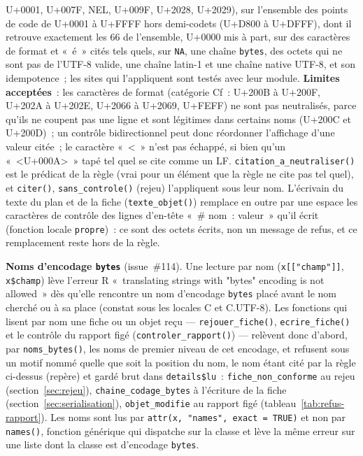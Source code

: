 \documentclass[a4paper,11pt]{article}
\newcommand{\code}[1]{\texttt{\small #1}}
\begin{document}
U+0001, U+007F, NEL, U+009F, U+2028, U+2029), sur l'ensemble des points de
code de U+0001 à U+FFFF hors demi-codets (U+D800 à U+DFFF), dont il
retrouve exactement les 66 de l'ensemble, U+0000 mis à part, sur des caractères de format et «~é~» cités tels quels, sur
\code{NA}, une chaîne \code{bytes}, des octets qui ne sont pas de l'UTF-8
valide, une chaîne latin-1 et une chaîne native UTF-8, et son
idempotence~; les sites qui l'appliquent sont testés avec leur module.
\textbf{Limites acceptées}~: les caractères de format
(catégorie Cf~: U+200B à U+200F, U+202A à U+202E, U+2066 à U+2069, U+FEFF)
ne sont pas neutralisés, parce qu'ils ne coupent pas une ligne et sont
légitimes dans certains noms (U+200C et U+200D)~; un contrôle
bidirectionnel peut donc réordonner l'affichage d'une valeur citée~; le
caractère «~<~» n'est pas échappé, si bien qu'un «~<U+000A>~» tapé tel
quel se cite comme un LF. \code{citation\_a\_neutraliser()} est le prédicat
de la règle (vrai pour un élément que la règle ne cite pas tel quel), et
\code{citer()}, \code{sans\_controle()} (rejeu) l'appliquent sous leur
nom. L'écrivain du texte du plan et de la fiche (\code{texte\_objet()})
remplace en outre par une espace les caractères de contrôle des lignes
d'en-tête «~\# nom~: valeur~» qu'il écrit (fonction locale
\code{propre})~: ce sont des octets écrits, non un message de refus, et ce
remplacement reste hors de la règle.

\medskip
\noindent
\textbf{Noms d'encodage \code{bytes}} (issue~\#114). Une lecture par nom
(\code{x[["champ"]]}, \code{x\$champ}) lève l'erreur R «~translating
strings with "bytes" encoding is not allowed~» dès qu'elle rencontre un
nom d'encodage \code{bytes} placé avant le nom cherché ou à sa place
(constat sous les locales C et C.UTF-8). Les fonctions qui lisent par nom
une fiche ou un objet reçu --- \code{rejouer\_fiche()},
\code{ecrire\_fiche()} et le contrôle du rapport figé
(\code{controler\_rapport()}) --- relèvent donc d'abord, par
\code{noms\_bytes()}, les noms de premier niveau de cet encodage, et
refusent sous un motif nommé quelle que soit la position du nom, le nom
étant cité par la règle ci-dessus (repère) et gardé brut dans
\code{details\$lu}~: \code{fiche\_non\_conforme} au rejeu
(section~\ref{sec:rejeu}), \code{chaine\_codage\_bytes} à l'écriture de la
fiche (section~\ref{sec:serialisation}), \code{objet\_modifie} au rapport
figé (tableau~\ref{tab:refus-rapport}). Les noms sont lus par
\code{attr(x, "names", exact = TRUE)} et non par \code{names()}, fonction
générique qui dispatche sur la classe et lève la même erreur sur une
liste dont la classe est d'encodage \code{bytes}.
\end{document}

